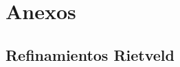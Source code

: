 \documentclass[../main.tex]{subfiles}
\begin{document}
\appendix
\chapter{Anexos}
\section{Refinamientos Rietveld}\label{sec:anexorietveld}
\end{document}
